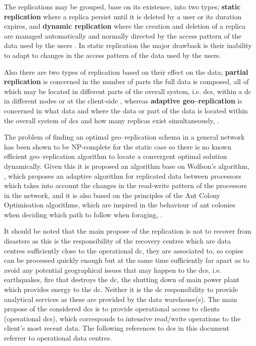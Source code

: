 \documentclass[english]{article}
\begin{document}
	The replications may be grouped, base on its existence, into two types; {\bf static replication} where a replica persist until it is deleted by a user or its duration expires, and {\bf dynamic replication} where the creation and deletion of a replica are managed automatically and normally directed by the access pattern of the data used by the users \cite{Dong2008a}. In static replication the major drawback is their inability to adapt to changes in the access pattern of the data used by the users.
	
	Also there are two types of replication based on their effect on the data; {\bf partial replication} is concerned in the number of parts the full data is composed, all of which may be located in different parts of the overall system, i.e. \glspl{dc}, within a \gls{dc} in different nodes or at the client-side \cite{Briquemont2015a, Briquemont2014a, Serrano2007a}, whereas {\bf adaptive geo--replication} is concerned in what data and where the data or part of the data is located within the overall system of \glspl{dc} and how many replicas exist simultaneously, \cite{Jeon2014a, KingsyGrace2013a, Wang2012a, Abad2011a, Abdul-Wahid2007a, Loukopoulos2004a}.
	
	The problem of finding an optimal geo--replication schema in a general network has been shown to be NP-complete for the static case \cite{Apers1988a,Wolfson1997a,Wolfson1991a} so there is no known efficient geo--replication algorithm to locate a convergent optimal solution dynamically. Given this it is proposed an algorithm base on Wolfson's algorithm, \cite{Wolfson1990a}, which proposes an adaptive algorithm for replicated data between processors which takes into account the changes in the read-write pattern of the processors in the network, and it is also based on the principles of the Ant Colony Optimisation algorithms, which are inspired in the behaviour of ant colonies when deciding which path to follow when foraging, \cite{dorigo1992a}.
	
	It should be noted that the main propose of the replication is not to recover from disasters as this is the responsibility of the recovery centres which are data centres sufficiently close to the operational \gls{dc}, they are associated to, so copies can be processed quickly enough but at the same time sufficiently far apart as to avoid any potential geographical issues that may happen to the \glspl{dc}, i.e. earthquakes, fire that destroys the \gls{dc}, the shutting down of main power plant which provides energy to the \gls{dc}. Neither it is the \gls{dc} responsibility to provide analytical services as these are provided by the data warehouse(s). The main propose of the considered \glspl{dc} is to provide operational access to clients (operational \glspl{dc}), which corresponds to intensive read/write operations to the client's most recent data. The following references to \glspl{dc} in this document referrer to operational data centres.
\end{document}
